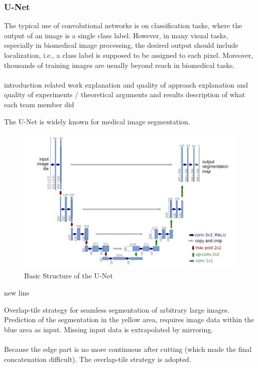 \documentclass{article}
\begin{document}
\subsubsection{U-Net}
The typical use of convolutional networks is on classification tasks, where the output of an image is a single class label. However, in many visual tasks,
especially in biomedical image processing, the desired output should include localization, i.e., a class label is supposed to be assigned to each pixel. Moreover, thousands of training images are usually beyond reach in biomedical tasks.
\\\\
introduction
related work
explanation and quality of approach
explanation and quality of experiments / theoretical arguments and results
description of what each team member did

The U-Net is widely known for medical image segmentation.
\begin{figure}[htp]
    \centering
    \includegraphics[scale = 0.8]{Figures/U-Net Architecture.png}
   \caption{Basic Structure of the U-Net}
\end{figure}
new line

Overlap-tile strategy for seamless segmentation of arbitrary large images. Prediction of the segmentation in the yellow area, requires image data within the blue area as input. Missing input data is extrapolated by mirroring. \\\\
Because the edge part is no more continuous after cutting (which made the final concatenation difficult). The overlap-tile strategy is adopted.
\end{document}

